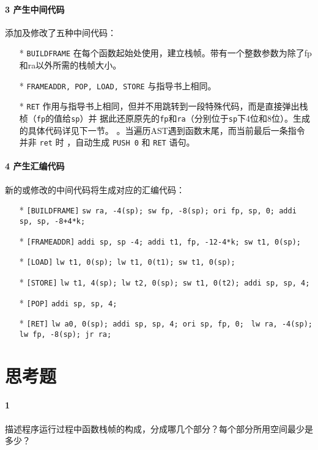 \documentclass[UTF8]{ctexart}
\newcommand{\T}[1]{\texttt{{#1}}}
\begin{document}
            \paragraph{3 产生中间代码} 添加及修改了五种中间代码：
            \begin{itemize}
                \item[*] \T{BUILDFRAME} 在每个函数起始处使用，建立栈帧。带有一个整数参数为除了fp和ra以外所需的栈帧大小。
                \item[*] \T{FRAMEADDR, POP, LOAD, STORE} 与指导书上相同。
                \item[*] \T{RET} 作用与指导书上相同，但并不用跳转到一段特殊代码，而是直接弹出栈桢（\T{fp}的值给\T{sp}）并
                据此还原原先的\T{fp}和\T{ra}（分别位于\T{sp}下4位和8位）。生成的具体代码详见下一节。
                。当遍历AST遇到函数末尾，而当前最后一条指令并非 \T{ret} 时
                ，自动生成 \T{PUSH 0} 和 \T{RET} 语句。
            \end{itemize}

            \paragraph{4 产生汇编代码} 新的或修改的中间代码将生成对应的汇编代码：
            \begin{itemize}
                \item[*] \T{[BUILDFRAME]} \T{sw ra, -4(sp); sw fp, -8(sp); ori fp, sp, 0; addi sp, sp, -8+4*k;}
                \item[*] \T{[FRAMEADDR]} \T{addi sp, sp -4; addi t1, fp, -12-4*k; sw t1, 0(sp);}
                \item[*] \T{[LOAD]} \T{lw t1, 0(sp); lw t1, 0(t1); sw t1, 0(sp);}
                \item[*] \T{[STORE]} \T{lw t1, 4(sp); lw t2, 0(sp); sw t1, 0(t2); addi sp, sp, 4;} 
                \item[*] \T{[POP]} \T{addi sp, sp, 4;} 
                \item[*] \T{[RET]} \T{lw a0, 0(sp); addi sp, sp, 4; ori sp, fp, 0; } 
                \T{lw ra, -4(sp); lw fp, -8(sp); jr ra;} 
            \end{itemize}
        
    \section{思考题}
        \paragraph{1} 描述程序运行过程中函数栈帧的构成，分成哪几个部分？每个部分所用空间最少是多少？
\end{document}
